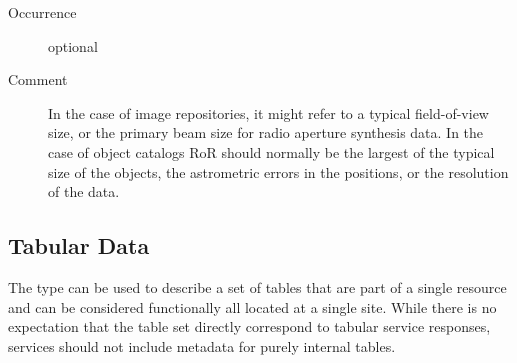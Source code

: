 \documentclass[11pt,a4paper]{ivoa}
\begin{document}
\begin{generated}
\begin{bigdescription}
\begin{description}
\item[Occurrence] optional
\item[Comment] 
                  In the case of image repositories, it might refer to
                  a typical field-of-view size, or the primary beam
                  size for radio aperture synthesis data.  In the case
                  of object catalogs RoR should normally be the
                  largest of the typical size of the objects, the
                  astrometric errors in the positions, or the
                  resolution of the data.  
               

\end{description}


\end{bigdescription}\endgroup

\endgroup
\end{generated}


\subsection{Tabular Data}
\label{sect:table}


The  type can be used
to describe a set of tables that are part of a single resource and can
be considered functionally all located at a single site.  While there is
no expectation that the table set directly correspond to tabular service
responses, services should not include metadata for purely internal
tables.
\end{document}
